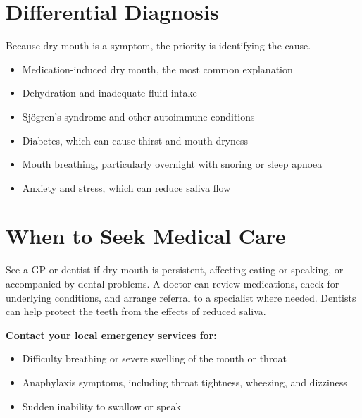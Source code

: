 \section*{Differential Diagnosis}
Because dry mouth is a symptom, the priority is identifying the cause.
\begin{itemize}
    \item Medication-induced dry mouth, the most common explanation
    \item Dehydration and inadequate fluid intake
    \item Sjögren's syndrome and other autoimmune conditions
    \item Diabetes, which can cause thirst and mouth dryness
    \item Mouth breathing, particularly overnight with snoring or sleep apnoea
    \item Anxiety and stress, which can reduce saliva flow
\end{itemize}

\section*{When to Seek Medical Care}
See a GP or dentist if dry mouth is persistent, affecting eating or speaking, or accompanied by dental problems. A doctor can review medications, check for underlying conditions, and arrange referral to a specialist where needed. Dentists can help protect the teeth from the effects of reduced saliva.

\textbf{Contact your local emergency services for:}
\begin{itemize}
    \item Difficulty breathing or severe swelling of the mouth or throat
    \item Anaphylaxis symptoms, including throat tightness, wheezing, and dizziness
    \item Sudden inability to swallow or speak
\end{itemize}

